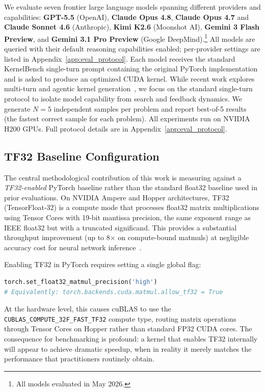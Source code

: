 \documentclass[]{fairmeta}
\begin{document}
We evaluate seven frontier large language models spanning different providers and capabilities: \textbf{GPT-5.5} (OpenAI), \textbf{Claude Opus 4.8}, \textbf{Claude Opus 4.7} and \textbf{Claude Sonnet 4.6} (Anthropic), \textbf{Kimi K2.6} (Moonshot AI), \textbf{Gemini 3 Flash Preview}, and \textbf{Gemini 3.1 Pro Preview} (Google DeepMind).\footnote{All models evaluated in May 2026.} All models are queried with their default reasoning capabilities enabled; per-provider settings are listed in Appendix~\ref{app:eval_protocol}. Each model receives the standard KernelBench single-turn prompt containing the original PyTorch implementation and is asked to produce an optimized CUDA kernel. While recent work explores multi-turn and agentic kernel generation~\citep{DBLP:journals/corr/abs-2602-24286,kernelbench}, we focus on the standard single-turn protocol to isolate model capability from search and feedback dynamics. We generate $N=5$ independent samples per problem and report best-of-5 results (the fastest correct sample for each problem).
All experiments run on NVIDIA H200 GPUs. Full protocol details are in Appendix~\ref{app:eval_protocol}.


\subsection{TF32 Baseline Configuration}
\label{sec:tf32}

The central methodological contribution of this work is measuring against a \emph{TF32-enabled} PyTorch baseline rather than the standard float32 baseline used in prior evaluations. On NVIDIA Ampere and Hopper architectures, TF32 (TensorFloat-32) is a compute mode that processes float32 matrix multiplications using Tensor Cores with 19-bit mantissa precision, the same exponent range as IEEE float32 but with a truncated significand. This provides a substantial throughput improvement (up to 8$\times$ on compute-bound matmuls) at negligible accuracy cost for neural network inference~\citep{tf32nvidia}.

Enabling TF32 in PyTorch requires setting a single global flag:
\begin{lstlisting}[language=Python,caption={Enabling TF32 acceleration in PyTorch. This routes all float32 matmul and convolution operations through Tensor Cores.}]
torch.set_float32_matmul_precision('high')
# Equivalently: torch.backends.cuda.matmul.allow_tf32 = True
\end{lstlisting}

At the hardware level, this causes cuBLAS to use the \texttt{CUBLAS\_COMPUTE\_32F\_FAST\_TF32} compute type, routing matrix operations through Tensor Cores on Hopper rather than standard FP32 CUDA cores.
The consequence for benchmarking is profound: a kernel that enables TF32 internally will appear to achieve dramatic speedup, when in reality it merely matches the performance that practitioners routinely obtain.
\end{document}
